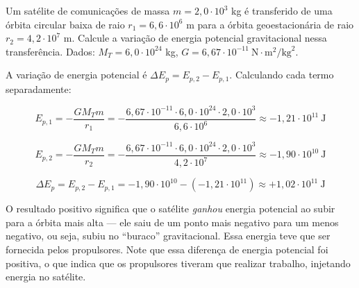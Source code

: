 \vspace{0.3cm}



\begin{exemplo}[Nível II]\label{exemplo_gravitacao_energiapotencialgravitacionalex02}
Um satélite de comunicações de massa $m = 2{,}0 \cdot 10^3$ kg é transferido de uma órbita circular baixa de raio $r_1 = 6{,}6 \cdot 10^6$ m para a órbita geoestacionária de raio $r_2 = 4{,}2 \cdot 10^7$ m. Calcule a variação de energia potencial gravitacional nessa transferência.
Dados: $M_T = 6{,}0 \cdot 10^{24}$ kg, $G = 6{,}67 \cdot 10^{-11}~\text{N}{\cdot}\text{m}^2/\text{kg}^2$.

\resolucao

A variação de energia potencial é $\Delta E_p = E_{p,2} - E_{p,1}$.
Calculando cada termo separadamente:

\[
  E_{p,1} = -\frac{GM_T m}{r_1}
          = -\frac{6{,}67\cdot10^{-11} \cdot 6{,}0\cdot10^{24}
                   \cdot 2{,}0\cdot10^3}
                  {6{,}6\cdot10^6}
          \approx -1{,}21\cdot10^{11}\ \text{J}
\]

\[
  E_{p,2} = -\frac{GM_T m}{r_2}
          = -\frac{6{,}67\cdot10^{-11} \cdot 6{,}0\cdot10^{24}
                   \cdot 2{,}0\cdot10^3}
                  {4{,}2\cdot10^7}
          \approx -1{,}90\cdot10^{10}\ \text{J}
\]

\[
  \Delta E_p = E_{p,2} - E_{p,1}
             = -1{,}90\cdot10^{10} - \left(-1{,}21\cdot10^{11}\right)
             \approx \boxed{+1{,}02\cdot10^{11}\ \text{J}}
\]

O resultado positivo significa que o satélite \textit{ganhou} energia
potencial ao subir para a órbita mais alta --- ele saiu de um ponto
mais negativo para um menos negativo, ou seja, subiu no ``buraco''
gravitacional. Essa energia teve que ser fornecida pelos propulsores. Note que essa diferença de energia potencial foi positiva, o que indica que os propulsores tiveram que realizar trabalho, injetando energia no satélite.


\end{exemplo}



\vspace{0.3cm}






